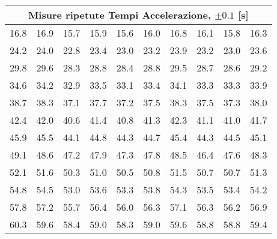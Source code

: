 \begin{tabular}{r r r r r r r r r r}

\multicolumn{ 10}{c}{Misure ripetute Tempi Accelerazione, $\pm 0.1$  [s]} \\ \hline
16.8 & 16.9 & 15.7 & 15.9 & 15.6 & 16.0 & 16.8 & 16.1 & 15.8 & 16.3 \\ \hline
24.2 & 24.0 & 22.8 & 23.4 & 23.0 & 23.2 & 23.9 & 23.2 & 23.0 & 23.6 \\ \hline
29.8 & 29.6 & 28.3 & 28.8 & 28.4 & 28.8 & 29.5 & 28.7 & 28.6 & 29.2 \\ \hline
34.6 & 34.2 & 32.9 & 33.5 & 33.1 & 33.4 & 34.1 & 33.3 & 33.3 & 33.9 \\ \hline
38.7 & 38.3 & 37.1 & 37.7 & 37.2 & 37.5 & 38.3 & 37.5 & 37.3 & 38.0 \\ \hline
42.4 & 42.0 & 40.6 & 41.4 & 40.8 & 41.3 & 42.3 & 41.1 & 41.0 & 41.7 \\ \hline
45.9 & 45.5 & 44.1 & 44.8 & 44.3 & 44.7 & 45.4 & 44.3 & 44.5 & 45.1 \\ \hline
49.1 & 48.6 & 47.2 & 47.9 & 47.3 & 47.8 & 48.5 & 46.4 & 47.6 & 48.3 \\ \hline
52.1 & 51.6 & 50.3 & 51.0 & 50.5 & 50.8 & 51.5 & 50.7 & 50.7 & 51.3 \\ \hline
54.8 & 54.5 & 53.0 & 53.6 & 53.3 & 53.8 & 54.3 & 53.5 & 53.4 & 54.2 \\ \hline
57.8 & 57.2 & 55.7 & 56.4 & 56.0 & 56.3 & 57.1 & 56.3 & 56.2 & 56.9 \\ \hline
60.3 & 59.6 & 58.4 & 59.0 & 58.3 & 59.0 & 59.6 & 58.8 & 58.8 & 59.4 \\ 
\end{tabular}

